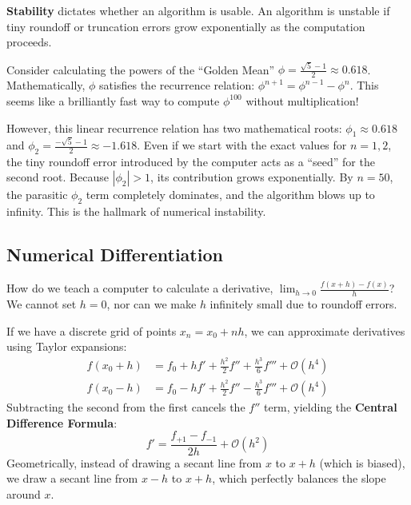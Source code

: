 \textbf{Stability} dictates whether an algorithm is usable. An algorithm is
unstable if tiny roundoff or truncation errors grow exponentially as the
computation proceeds.

\begin{tcolorbox}[colback=red!5!white,colframe=red!75!black,
  title=Intuitive Analogy: The Golden Mean Recursion]
Consider calculating the powers of the ``Golden Mean'' $\phi =
\frac{\sqrt{5}-1}{2} \approx 0.618$. Mathematically, $\phi$ satisfies the
recurrence relation: $\phi^{n+1} = \phi^{n-1} - \phi^n$. This seems like a
brilliantly fast way to compute $\phi^{100}$ without multiplication!

However, this linear recurrence relation has two mathematical roots:
$\phi_1 \approx 0.618$ and $\phi_2 = \frac{-\sqrt{5}-1}{2} \approx -1.618$.
Even if we start with the exact values for $n=1, 2$, the tiny roundoff error
introduced by the computer acts as a ``seed'' for the second root. Because
$|\phi_2| > 1$, its contribution grows exponentially. By $n=50$, the
parasitic $\phi_2$ term completely dominates, and the algorithm blows up to
infinity. This is the hallmark of numerical instability.
\end{tcolorbox}

\subsection{Numerical Differentiation}
How do we teach a computer to calculate a derivative,
$\lim_{h \to 0} \frac{f(x+h)-f(x)}{h}$? We cannot set $h=0$, nor can we
make $h$ infinitely small due to roundoff errors.

If we have a discrete grid of points $x_n = x_0 + nh$, we can approximate
derivatives using Taylor expansions:
\begin{align*}
f(x_0 + h) &= f_0 + h f' + \frac{h^2}{2} f'' + \frac{h^3}{6} f''' +
\mathcal{O}(h^4) \\
f(x_0 - h) &= f_0 - h f' + \frac{h^2}{2} f'' - \frac{h^3}{6} f''' +
\mathcal{O}(h^4)
\end{align*}
Subtracting the second from the first cancels the $f''$ term, yielding the
\textbf{Central Difference Formula}:
\begin{equation}
f' = \frac{f_{+1} - f_{-1}}{2h} + \mathcal{O}(h^2)
\end{equation}
Geometrically, instead of drawing a secant line from $x$ to $x+h$ (which is
biased), we draw a secant line from $x-h$ to $x+h$, which perfectly balances
the slope around $x$.

